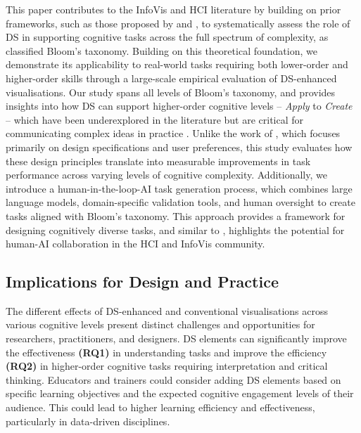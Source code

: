 This paper contributes to the InfoVis and HCI literature by building on prior frameworks, such as those proposed by \citet{adar2021communicative} and \citet{shao2024datastorytelling}, to systematically assess the role of DS in supporting cognitive tasks across the full spectrum of complexity, as classified Bloom's taxonomy. Building on this theoretical foundation, we demonstrate its applicability to real-world tasks requiring both lower-order and higher-order skills through a large-scale empirical evaluation of DS-enhanced visualisations. Our study spans all levels of Bloom’s taxonomy, and provides insights into how DS can support higher-order cognitive levels -- \textit{Apply} to \textit{Create} -- which have been underexplored in the literature but are critical for communicating complex ideas in practice \cite{morth2023scrollyvis, seyser2018scrollytelling}. Unlike the work of \citet{leerobbins2022learning}, which focuses primarily on design specifications and user preferences, this study evaluates how these design principles translate into measurable improvements in task performance across varying levels of cognitive complexity. Additionally, we introduce a human-in-the-loop-AI task generation process, which combines large language models, domain-specific validation tools, and human oversight to create tasks aligned with Bloom's taxonomy. This approach provides a framework for designing cognitively diverse tasks, and similar to \citet{yan2024data,yan2024vizchat}, highlights the potential for human-AI collaboration in the HCI and InfoVis community.

\subsection{Implications for Design and Practice}
The different effects of DS-enhanced and conventional visualisations across various cognitive levels present distinct challenges and opportunities for researchers, practitioners, and designers. DS elements can significantly improve the effectiveness \textbf{(RQ1)} in understanding tasks and improve the efficiency \textbf{(RQ2)} in higher-order cognitive tasks requiring interpretation and critical thinking. Educators and trainers could consider adding DS elements based on specific learning objectives and the expected cognitive engagement levels of their audience. This could lead to higher learning efficiency and effectiveness, particularly in data-driven disciplines.

